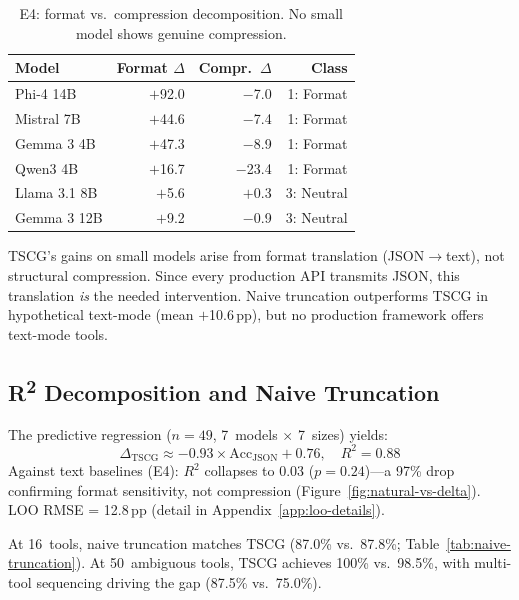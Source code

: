 \begin{table}[h]
\centering
\small
\caption{E4: format vs.\ compression decomposition. No small model shows genuine compression.}
\label{tab:e4-decomposition}
\begin{tabular}{lrrr}
\toprule
\textbf{Model} & \textbf{Format $\Delta$} & \textbf{Compr.\ $\Delta$} & \textbf{Class} \\
\midrule
Phi-4 14B    & $+$92.0 & $-$7.0  & 1: Format \\
Mistral 7B   & $+$44.6 & $-$7.4  & 1: Format \\
Gemma 3 4B   & $+$47.3 & $-$8.9  & 1: Format \\
Qwen3 4B     & $+$16.7 & $-$23.4 & 1: Format \\
Llama 3.1 8B & $+$5.6  & $+$0.3  & 3: Neutral \\
Gemma 3 12B  & $+$9.2  & $-$0.9  & 3: Neutral \\
\bottomrule
\end{tabular}
\end{table}

TSCG's gains on small models arise from format translation (JSON$\to$text), not structural compression.
Since every production API transmits JSON, this translation \emph{is} the needed intervention.
Naive truncation outperforms TSCG in hypothetical text-mode (mean $+$10.6\,pp), but no production framework offers text-mode tools.

\subsection{R\textsuperscript{2} Decomposition and Naive Truncation}
\label{sec:correlation-thesis}

The predictive regression ($n{=}49$, 7~models $\times$ 7~sizes) yields:
\begin{equation}
\Delta_\text{TSCG} \approx -0.93 \times \text{Acc}_\text{JSON} + 0.76, \quad R^2 = 0.88
\label{eq:correlation}
\end{equation}
Against text baselines (E4): $R^2$ collapses to 0.03 ($p{=}0.24$)---a 97\% drop confirming format sensitivity, not compression (Figure~\ref{fig:natural-vs-delta}).
LOO RMSE = 12.8\,pp (detail in Appendix~\ref{app:loo-details}).



\label{sec:naive-truncation}
At 16~tools, naive truncation matches TSCG (87.0\% vs.\ 87.8\%; Table~\ref{tab:naive-truncation}).
At 50~ambiguous tools, TSCG achieves 100\% vs.\ 98.5\%, with multi-tool sequencing driving the gap (87.5\% vs.\ 75.0\%).

